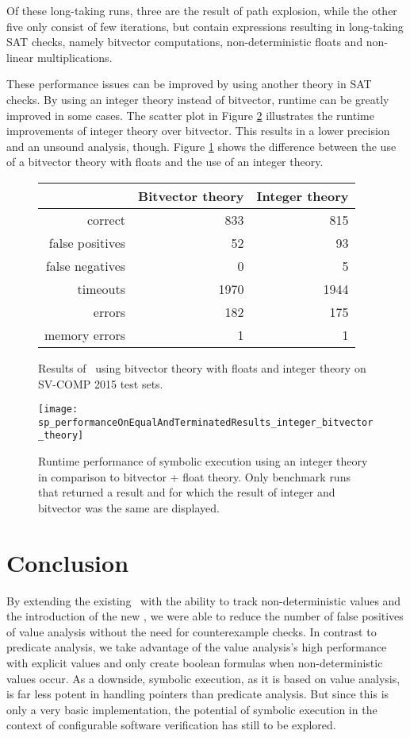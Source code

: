 Of these long-taking runs, three are the result of path explosion,
while the other five only consist of few iterations, but contain expressions resulting in long-taking SAT checks, namely bitvector computations, non-deterministic floats and non-linear multiplications.

These performance issues can be improved by using another theory in SAT checks.
By using an integer theory instead of bitvector, runtime can be greatly improved in some cases.
The scatter plot in Figure \ref{graph:bitvecIntCompGraph} illustrates the runtime improvements of integer theory over bitvector.
This results in a lower precision and an unsound analysis, though.
Figure \ref{tab:bitvecIntComp} shows the difference between the use of a bitvector theory with floats and the use of an integer theory.
\begin{figure}[h]
\begin{tabular}{| r || r | r |}
\hline
& Bitvector theory & Integer theory \\ \hline
correct         &  833 &  815 \\ \hline
false positives &   52 &   93 \\ \hline
false negatives &    0 &    5 \\ \hline
timeouts        & 1970 & 1944 \\ \hline
errors          &  182 &  175 \\ \hline
memory errors   &    1 &    1 \\ \hline
\end{tabular}
\caption{Results of \symbolicExecutionCPA\ using bitvector theory with floats and integer theory on SV-COMP 2015 test sets.}
\label{tab:bitvecIntComp}
\end{figure}

\begin{figure}[h]
\texttt{[image: sp\_performanceOnEqualAndTerminatedResults\_integer\_bitvector\_theory]}
\caption{Runtime performance of symbolic execution using an integer theory in comparison to bitvector + float theory.
\label{graph:bitvecIntCompGraph}
         Only benchmark runs that returned a result and for which the result of integer and bitvector was the same are
         displayed.}
\end{figure}

\section{Conclusion}
By extending the existing \ with the ability to track non-deterministic values and the introduction of the new \constraintsCPA,
we were able to reduce the number of false positives of value analysis without the need for counterexample checks.
In contrast to predicate analysis, we take advantage of the value analysis's high performance with explicit values and only create boolean formulas when non-deterministic values occur.
As a downside, symbolic execution, as it is based on value analysis, is far less potent in handling pointers than predicate analysis.
But since this is only a very basic implementation, the potential of symbolic execution in the context of configurable software verification has still to be explored.

